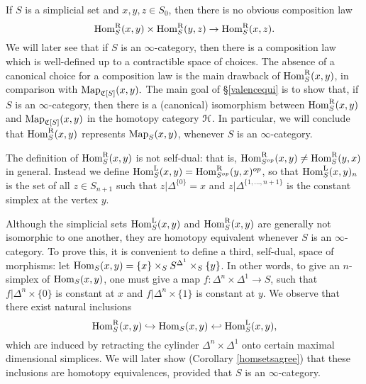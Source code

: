 \begin{remark}\label{needie}
If $S$ is a simplicial set and $x,y,z \in S_0$, then there is no
obvious composition law
$$\operatorname{Hom}^{\operatorname{R}}_{S}(x,y) \times \operatorname{Hom}^{\operatorname{R}}_{S}(y,z) \rightarrow \operatorname{Hom}^{\operatorname{R}}_{S}(x,z).$$
We will later see that if $S$ is an $\infty$-category, then there is a
composition law which is well-defined up to a
contractible space of choices. The absence of a canonical choice for a composition
law is the main drawback of $\operatorname{Hom}^{\operatorname{R}}_{S}(x,y)$, in comparison with
$\operatorname{{Map}}_{\operatorname{\mathfrak{C}}[S]}(x,y).$
The main goal of \S \ref{valencequi} is to show that, if $S$ is an $\infty$-category, then there is a 
(canonical) isomorphism between $\operatorname{Hom}^{\operatorname{R}}_{S}(x,y)$ and $\operatorname{{Map}}_{\operatorname{\mathfrak{C}}[S]}(x,y)$
in the homotopy category $\operatorname{\mathcal{H}}$. In particular, we will conclude that
$\operatorname{Hom}^{\operatorname{R}}_{S}(x,y)$ represents $\operatorname{{Map}}_{S}(x,y)$, whenever $S$ is an $\infty$-category.
\end{remark}

\begin{remark}\label{swink}
The definition of $\operatorname{Hom}^{\operatorname{R}}_{S}(x,y)$ is not self-dual: that
is, $\operatorname{Hom}^{\operatorname{R}}_{S^{op}}(x,y) \neq \operatorname{Hom}^{\operatorname{R}}_{S}(y,x)$ in
general. Instead we define $\operatorname{Hom}^{\operatorname{L}}_S(x,y) =
\operatorname{Hom}^{\operatorname{R}}_{S^{op}}(y,x)^{op}$, so that $\operatorname{Hom}^{\operatorname{L}}_{S}(x,y)_n$ is
the set of all $z \in S_{n+1}$ such that $z|\Delta^{ \{0\} } = x$
and $z | \Delta^{ \{1, \ldots, n+1\} }$ is the constant simplex at
the vertex $y$. \end{remark}

Although the simplicial sets $\operatorname{Hom}^{\operatorname{L}}_S(x,y)$ and
$\operatorname{Hom}^{\operatorname{R}}_S(x,y)$ are generally not isomorphic to one another,
they are homotopy equivalent whenever $S$ is an $\infty$-category. To
prove this, it is convenient to define a third, self-dual, space
of morphisms: let $\operatorname{Hom}_{S}(x,y) = \{x\} \times_S S^{\Delta^1}
\times_S \{y\}$. In other words, to give an $n$-simplex of
$\operatorname{Hom}_{S}(x,y)$, one must give a map $f: \Delta^n \times \Delta^1
\rightarrow S$, such that $f| \Delta^n \times \{0\}$ is constant
at $x$ and $f| \Delta^n \times \{1\}$ is constant at $y$. We
observe that there exist natural inclusions
$$ \operatorname{Hom}^{\operatorname{R}}_{S}(x,y) \hookrightarrow \operatorname{Hom}_S(x,y) \hookleftarrow
\operatorname{Hom}^{\operatorname{L}}_{S}(x,y),$$ 
which are induced by retracting the cylinder $\Delta^n \times \Delta^1$ onto certain maximal dimensional simplices. We will later show (Corollary
\ref{homsetsagree}) that these inclusions are homotopy
equivalences, provided that $S$ is an $\infty$-category.

